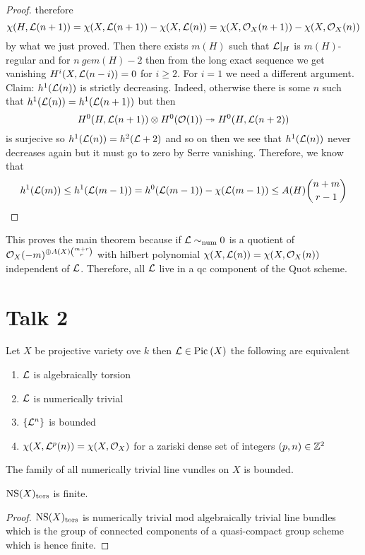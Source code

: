 \documentclass[12pt]{article}
\begin{document}
\begin{proof}
therefore
\[ \chi(H, \mathcal{L}(n+1)) = \chi(X, \mathcal{L}(n+1)) - \chi(X, \mathcal{L}(n)) = \chi(X, \mathcal{O}_{X}(n+1)) - \chi(X, \mathcal{O}_{X}(n)) \]
by what we just proved. Then there exists $m(H)$ such that $\mathcal{L}|_H$ is $m(H)$-regular and for $n \ ge m(H) - 2$ then from the long exact sequence we get vanishing $H^i(X, \mathcal{L}(n-i)) = 0$ for $i \ge 2$. For $i = 1$ we need a different argument. Claim: $h^1(\mathcal{L}(n))$ is strictly decreasing. Indeed, otherwise there is some $n$ such that $h^1(\mathcal{L}(n)) = h^1(\mathcal{L}(n+1))$ but then 
\[ H^0(H, \mathcal{L}(n+1)) \otimes H^0(\mathcal{O}_{}(1)) \twoheadrightarrow H^0(H, \mathcal{L}(n+2)) \]
is surjecive so $h^1(\mathcal{L}(n)) = h^2(\mathcal{L}+2)$ and so on then we see that $h^1(\mathcal{L}(n))$ never decreases again but it must go to zero by Serre vanishing. Therefore, we know that
\[ h^1(\mathcal{L}(m)) \le h^1(\mathcal{L}(m-1)) = h^0(\mathcal{L}(m-1)) - \chi(\mathcal{L}(m-1)) \le A(H) { n + m \choose r - 1 } \]
\end{proof}

This proves the main theorem because if $\mathcal{L} \sim_{\text{num}} 0$ is a quotient of $\mathcal{O}_{X}(-m)^{\oplus A(X) {m + r \choose r}}$ with hilbert polynomial $\chi(X, \mathcal{L}(n)) = \chi(X, \mathcal{O}_{X}(n))$ independent of $\mathcal{L}$. Therefore, all $\mathcal{L}$ live in a qc component of the Quot scheme.


\section{Talk 2}

\begin{theorem}
Let $X$ be projective variety ove $k$ then $\mathcal{L} \in \mathrm{Pic}^{} \left( X \right)$ the following are equivalent
\begin{enumerate}
\item $\mathcal{L}$ is algebraically torsion
\item $\mathcal{L}$ is numerically trivial
\item $\{ \mathcal{L}^n \}$ is bounded
\item $\chi(X, \mathcal{L}^p(n)) = \chi(X, \mathcal{O}_{X})$ for a zariski dense set of integers $(p,n) \in \mathbb{Z}^2$
\end{enumerate}
\end{theorem}

\begin{theorem}
The family of all numerically trivial line vundles on $X$ is bounded.
\end{theorem}

\begin{cor}
$\mathrm{NS}(X)_{\mathrm{tors}}$ is finite.
\end{cor}

\begin{proof}
$\mathrm{NS}(X)_{\mathrm{tors}}$ is numerically trivial mod algebraically trivial line bundles which is the group of connected components of a quasi-compact group scheme which is hence finite. 
\end{proof}
\end{document}
